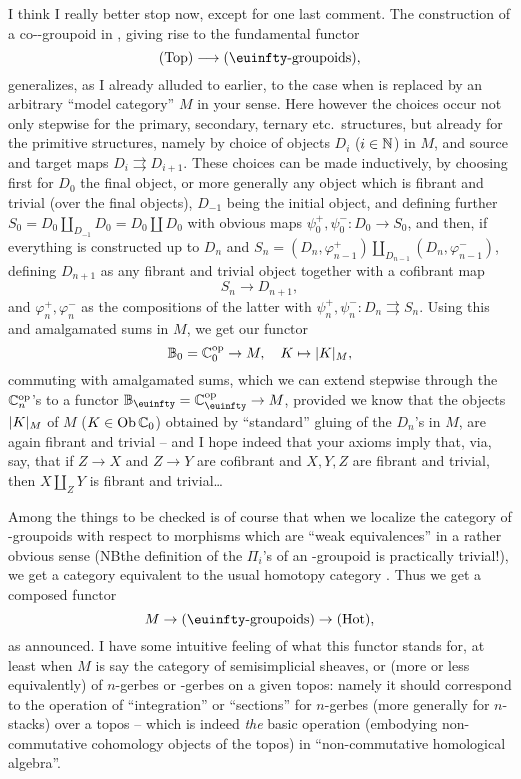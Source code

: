 \label{sec:12}%
I think I really better stop now, except for one last comment. The
construction of a co-\oo-groupoid in \cTop, giving rise to the
fundamental functor
\[ \cTop \longrightarrow (\text{\oo-groupoids}),\]
generalizes, as I already alluded to earlier, to the case when \cTop{}
is replaced by an arbitrary ``model category'' $M$ in your sense. Here
however the choices occur not only stepwise for the primary,
secondary, ternary etc.\ structures, but already for the primitive
structures, namely by choice of objects $D_i$ ($i\in{\ensuremath{\mathbb{N}}}$) in $M$, and
source and target maps $D_i \rightrightarrows D_{i+1}$. These choices
can be made inductively, by choosing first for $D_0$ the final object,
or more generally any object which is fibrant and trivial (over the
final objects), $D_{-1}$ being the initial object, and defining
further $S_0 = D_0 \amalg_{D_{-1}} D_0 = D_0 \amalg D_0$ with obvious
maps $\psi_0^+,\psi_0^- : D_0 \to S_0$, and then, if everything is
constructed up to $D_n$ and $S_n = (D_n,\varphi_{n-1}^+)
\amalg_{D_{n-1}} (D_n,\varphi_{n-1}^-)$, defining $D_{n+1}$ as any
fibrant and trivial object together with a cofibrant map
\[ S_n \to D_{n+1}, \]
and $\varphi_n^+, \varphi_n^-$ as the compositions of the latter with
$\psi_n^+,\psi_n^-: D_n \rightrightarrows S_n$.
Using this and amalgamated sums in $M$, we get our functor
\[ {\mathbb{B}}_0 = {\mathbb{C}}_0^{\mathrm{op}} \to M , \quad K\mapsto \lvert K\rvert_M,\]
commuting with amalgamated sums, which we can extend stepwise through
the ${\mathbb{C}}_n^{\mathrm{op}}$'s to a functor $\bB_\oo = \bC_\oo\op \to M$,
provided we know that the objects $\lvert K\rvert_M$ of $M$ ($K\in\operatorname{Ob}{\mathbb{C}}_0$)
obtained by ``standard'' gluing of the $D_n$'s in $M$, are again
fibrant and trivial -- and I hope indeed that your axioms imply that,
via, say, that if $Z \to X$ and $Z\to Y$ are cofibrant and $X,Y,Z$ are
fibrant and trivial, then $X \amalg_Z Y$ is fibrant and trivial\ldots

Among the things to be checked is of course that when we localize the
category of \oo-groupoids with respect to morphisms which are ``weak
equivalences'' in a rather obvious sense (NB\enspace the definition of the
$\Pi_i$'s of an \oo-groupoid is practically trivial!), we get a
category equivalent to the usual homotopy category \Hot. Thus we get a
composed functor
\[ M \to (\text{\oo-groupoids}) \to \Hot,\]
as announced. I have some intuitive feeling of what this functor
stands for, at least when $M$ is say the category of semisimplicial
sheaves, or (more or less equivalently) of $n$-gerbes or \oo-gerbes on
a given topos: namely it should correspond to the operation of
``integration'' or ``sections'' for $n$-gerbes (more generally for
$n$-stacks) over a topos -- which is indeed \emph{the} basic operation
(embodying non-commutative cohomology objects of the topos) in
``non-commutative homological algebra''.

